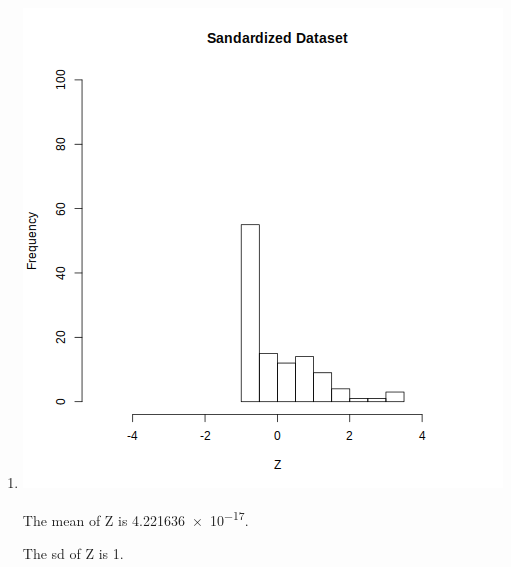 \documentclass[12pt,letterpaper]{article}
\begin{document}
\begin{enumerate}
\begin{enumerate}
        \item
          \includegraphics[width=\linewidth]{prob2b.png}

          The mean of Z is \num{4.221636e-17}.

          The sd of Z is \num{1}.


\end{enumerate}
\end{enumerate}
\end{document}
